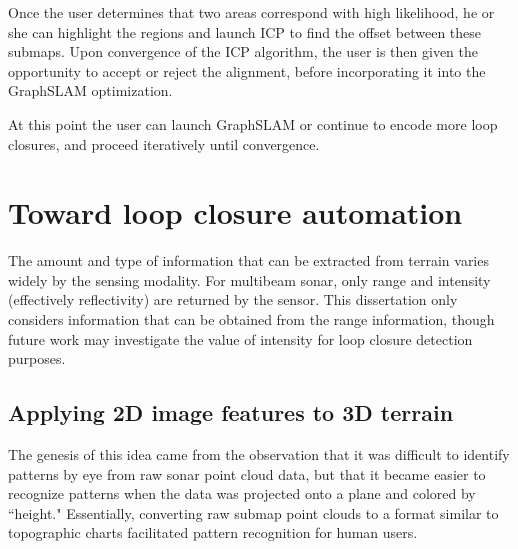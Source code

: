 Once the user determines that two areas correspond with high likelihood, he or she can highlight the regions and launch ICP to find the offset between these submaps. Upon convergence of the ICP algorithm, the user is then given the opportunity to accept or reject the alignment, before incorporating it into the GraphSLAM optimization. 

At this point the user can launch GraphSLAM or continue to encode more loop closures, and proceed iteratively until convergence.


\section{Toward loop closure automation}

The amount and type of information that can be extracted from terrain varies widely by the sensing modality. For multibeam sonar, only range and intensity (effectively reflectivity) are returned by the sensor. This dissertation only considers information that can be obtained from the range information, though future work may investigate the value of intensity for loop closure detection purposes.

\subsection{Applying 2D image features to 3D terrain}



The genesis of this idea came from the observation that it was difficult to identify patterns by eye from raw sonar point cloud data, but that it became easier to recognize patterns when the data was projected onto a plane and colored by ``height." Essentially, converting raw submap point clouds to a format similar to topographic charts facilitated pattern recognition for human users.

